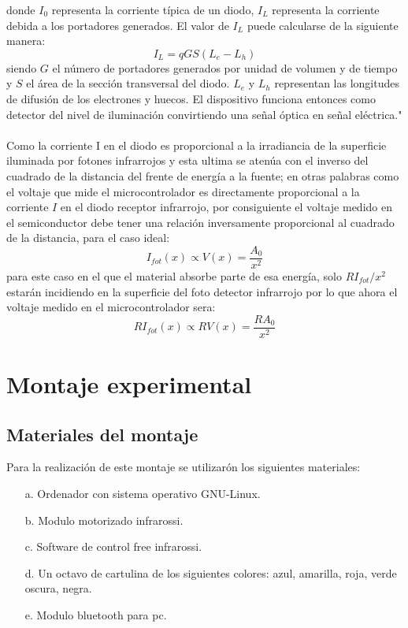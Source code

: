 \documentclass[12]{article}
\begin{document}
\begin{multicols}{2}
\begin{equation}
\end{equation}
donde $I_{0}$ representa la corriente típica de un diodo, $I_{L}$ representa la corriente debida a  los portadores generados. El valor de $I_{L}$ puede calcularse de la siguiente manera:
\begin{equation}
I_{L} = qGS(L_{e} - L_{h})
\end{equation}
siendo $G$ el número de portadores generados por unidad de volumen y de tiempo y $S$ el área de la sección transversal del diodo. $L_{e}$ y $L_{h}$ representan las longitudes de difusión de los electrones y huecos. El dispositivo funciona entonces como detector del nivel de iluminación  convirtiendo una señal óptica en señal eléctrica." \cite{FOTOELECTRICO}\\ \\ 
Como la corriente I en el diodo es proporcional a la irradiancia de la superficie iluminada por fotones infrarrojos y esta ultima se atenúa con el inverso del cuadrado de la distancia del frente de energía a la fuente; en otras palabras como el voltaje que mide el microcontrolador es directamente proporcional a la corriente $I$ en el diodo receptor infrarrojo, por consiguiente el voltaje medido en el semiconductor debe  tener una relación inversamente proporcional al cuadrado de la distancia, para el caso ideal:
\begin{equation}
I_{fot}(x) \propto V(x) = \frac{A_{0}}{x^{2}}
\end{equation}
para este caso en el que el material absorbe  parte de esa energía, solo $RI_{fot} /x^{2}$ estarán incidiendo en la superficie del foto detector infrarrojo por lo que ahora el voltaje medido en el microcontrolador sera:
\begin{equation}
RI_{fot}(x) \propto RV(x) = \frac{RA_{0}}{x^{2}}
\end{equation}
\section{Montaje experimental}
\subsection{Materiales del montaje}
Para la realización de este montaje se utilizarón los siguientes materiales:
\begin{enumerate}
\item[a.] Ordenador con sistema operativo GNU-Linux.
\item[b.] Modulo motorizado infrarossi.
\item[c.] Software de control free infrarossi.
\item[d.] Un octavo de cartulina de los siguientes colores: azul, amarilla, roja, verde oscura, negra.
\item[e.] Modulo bluetooth para pc.
\end{enumerate}

\end{multicols}
\end{document}
